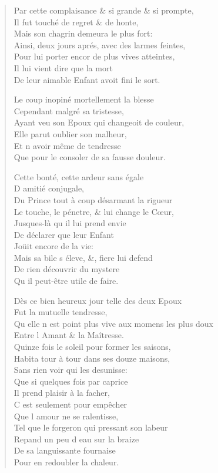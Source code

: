 \begin{verse}
Par cette complaisance \& si grande \& si prompte, \\
\vin Il fut touché de regret \& de honte, \\
\vin Mais son chagrin demeura le plus fort: \\
Ainsi, deux jours aprés, avec des larmes feintes, \\
Pour lui porter encor de plus vives atteintes, \\
\vin Il lui vient dire que la mort \\
De leur aimable Enfant avoit fini le sort.

Le coup inopiné mortellement la blesse \\
\vin Cependant malgré sa tristesse, \\
Ayant veu son Epoux qui changeoit de couleur, \\
\vin Elle parut oublier son malheur, \\
\vin Et n\textquotesingle{} avoir même de tendresse \\
Que pour le consoler de sa fausse douleur.

\vin Cette bonté, cette ardeur sans égale \\
\vin D\textquotesingle{} amitié conjugale, \\
Du Prince tout à coup désarmant la rigueur \\
Le touche, le pénetre, \& lui change le Cœur, \\
\vin Jusques-là qu\textquotesingle{} il lui prend envie \\
\vin De déclarer que leur Enfant \\
\vin Joüit encore de la vie: \\
Mais sa bile s\textquotesingle{} éleve, \&, fiere lui defend \\
\vin De rien découvrir du mystere \\
\vin Qu\textquotesingle{} il peut-être utile de faire.

Dès ce bien heureux jour telle des deux Epoux \\
\vin Fut la mutuelle tendresse, \\
Qu\textquotesingle{} elle n\textquotesingle{} est point plus vive aux momens les plus doux \\
\vin Entre l\textquotesingle{} Amant \& la Maîtresse. \\
Quinze fois le soleil pour former les saisons, \\
Habita tour à tour dans ses douze maisons, \\
\vin Sans rien voir qui les desunisse: \\
\vin Que si quelques fois par caprice \\
\vin Il prend plaisir à la facher, \\
\vin C\textquotesingle{} est seulement pour empêcher \\
\vin Que l\textquotesingle{} amour ne se ralentisse, \\
Tel que le forgeron qui pressant son labeur \\
\vin Repand un peu d\textquotesingle{} eau sur la braize \\
\vin De sa languissante fournaise \\
\vin Pour en redoubler la chaleur.


\end{verse}
